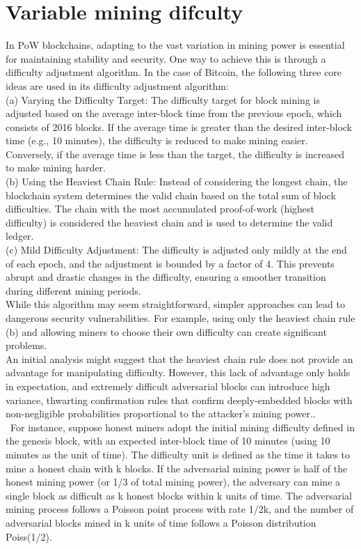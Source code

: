 \section{Variable mining difculty}
In PoW blockchains, adapting to the vast variation in mining power is essential for maintaining stability and security. One way to achieve this is through a difficulty adjustment algorithm. In the case of Bitcoin, the following three core ideas are used in its difficulty adjustment algorithm:\\
(a) Varying the Difficulty Target: The difficulty target for block mining is adjusted based on the average inter-block time from the previous epoch, which consists of 2016 blocks. If the average time is greater than the desired inter-block time (e.g., 10 minutes), the difficulty is reduced to make mining easier. Conversely, if the average time is less than the target, the difficulty is increased to make mining harder.\\
(b) Using the Heaviest Chain Rule: Instead of considering the longest chain, the blockchain system determines the valid chain based on the total sum of block difficulties. The chain with the most accumulated proof-of-work (highest difficulty) is considered the heaviest chain and is used to determine the valid ledger.\\
(c) Mild Difficulty Adjustment: The difficulty is adjusted only mildly at the end of each epoch, and the adjustment is bounded by a factor of 4. This prevents abrupt and drastic changes in the difficulty, ensuring a smoother transition during different mining periods.\\
While this algorithm may seem straightforward, simpler approaches can lead to dangerous security vulnerabilities. For example, using only the heaviest chain rule (b) and allowing miners to choose their own difficulty can create significant problems.\\
An initial analysis might suggest that the heaviest chain rule does not provide an advantage for manipulating difficulty. However, this lack of advantage only holds in expectation, and extremely difficult adversarial blocks can introduce high variance, thwarting confirmation rules that confirm deeply-embedded blocks with non-negligible probabilities proportional to the attacker's mining power\cite{reference1}..\\\
For instance, suppose honest miners adopt the initial mining difficulty defined in the genesis block, with an expected inter-block time of 10 minutes (using 10 minutes as the unit of time). The difficulty unit is defined as the time it takes to mine a honest chain with k blocks. If the adversarial mining power is half of the honest mining power (or 1/3 of total mining power), the adversary can mine a single block as difficult as k honest blocks within k units of time. The adversarial mining process follows a Poisson point process with rate 1/2k, and the number of adversarial blocks mined in k units of time follows a Poisson distribution Poiss(1/2).\\
